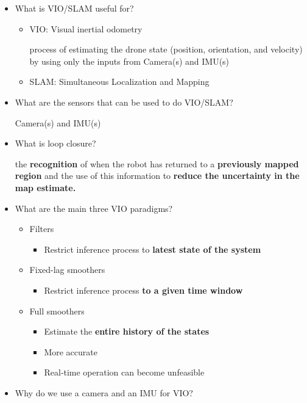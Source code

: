 \documentclass[]{article}
\begin{document}
\begin{itemize}
\item
  What is VIO/SLAM useful for?

  \begin{itemize}
  \item
    VIO: Visual inertial odometry

    process of estimating the drone state (position, orientation, and
    velocity) by using only the inputs from Camera(s) and IMU(s)
  \item
    SLAM: Simultaneous Localization and Mapping
  \end{itemize}
\item
  What are the sensors that can be used to do VIO/SLAM?

  Camera(s) and IMU(s)
\item
  What is loop closure?

  the \textbf{recognition} of when the robot has returned to a
  \textbf{previously mapped region} and the use of this information to
  \textbf{reduce the uncertainty in the map estimate.}
\item
  What are the main three VIO paradigms?

  \begin{itemize}
  \item
    Filters

    \begin{itemize}
    \item
      Restrict inference process to \textbf{latest state of the system}
    \end{itemize}
  \item
    Fixed-lag smoothers

    \begin{itemize}
    \item
      Restrict inference process \textbf{to a given time window}
    \end{itemize}
  \item
    Full smoothers

    \begin{itemize}
    \item
      Estimate the \textbf{entire history of the states}
    \item
      More accurate
    \item
      Real‐time operation can become unfeasible
    \end{itemize}
  \end{itemize}
\item
  Why do we use a camera and an IMU for VIO?


\end{itemize}
\end{document}

